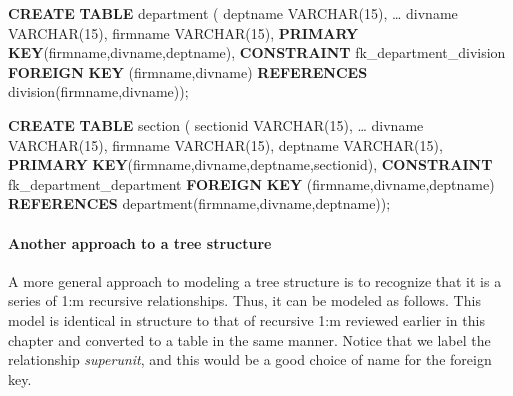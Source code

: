 \documentclass[
]{article}
\newenvironment{Shaded}{\begin{snugshade}}{\end{snugshade}}
\newcommand{\DataTypeTok}[1]{\textcolor[rgb]{0.13,0.29,0.53}{#1}}
\newcommand{\DecValTok}[1]{\textcolor[rgb]{0.00,0.00,0.81}{#1}}
\newcommand{\KeywordTok}[1]{\textcolor[rgb]{0.13,0.29,0.53}{\textbf{#1}}}
\newcommand{\NormalTok}[1]{#1}
\begin{document}
\begin{Shaded}
\begin{Highlighting}[]
\KeywordTok{CREATE} \KeywordTok{TABLE}\NormalTok{ department (}
\NormalTok{    deptname        }\DataTypeTok{VARCHAR}\NormalTok{(}\DecValTok{15}\NormalTok{), }
\NormalTok{    … }
\NormalTok{    divname     }\DataTypeTok{VARCHAR}\NormalTok{(}\DecValTok{15}\NormalTok{),}
\NormalTok{    firmname        }\DataTypeTok{VARCHAR}\NormalTok{(}\DecValTok{15}\NormalTok{),}
        \KeywordTok{PRIMARY} \KeywordTok{KEY}\NormalTok{(firmname,divname,deptname),}
        \KeywordTok{CONSTRAINT}\NormalTok{ fk\_department\_division}
            \KeywordTok{FOREIGN} \KeywordTok{KEY}\NormalTok{ (firmname,divname) }
                \KeywordTok{REFERENCES}\NormalTok{ division(firmname,divname));}
\end{Highlighting}
\end{Shaded}

\begin{Shaded}
\begin{Highlighting}[]
\KeywordTok{CREATE} \KeywordTok{TABLE}\NormalTok{ section (}
\NormalTok{    sectionid       }\DataTypeTok{VARCHAR}\NormalTok{(}\DecValTok{15}\NormalTok{), }
\NormalTok{    … }
\NormalTok{    divname     }\DataTypeTok{VARCHAR}\NormalTok{(}\DecValTok{15}\NormalTok{),}
\NormalTok{    firmname        }\DataTypeTok{VARCHAR}\NormalTok{(}\DecValTok{15}\NormalTok{),}
\NormalTok{    deptname        }\DataTypeTok{VARCHAR}\NormalTok{(}\DecValTok{15}\NormalTok{),}
        \KeywordTok{PRIMARY} \KeywordTok{KEY}\NormalTok{(firmname,divname,deptname,sectionid),}
        \KeywordTok{CONSTRAINT}\NormalTok{ fk\_department\_department}
            \KeywordTok{FOREIGN} \KeywordTok{KEY}\NormalTok{ (firmname,divname,deptname) }
                \KeywordTok{REFERENCES}\NormalTok{ department(firmname,divname,deptname));}
\end{Highlighting}
\end{Shaded}

\hypertarget{another-approach-to-a-tree-structure}{%
\paragraph*{Another approach to a tree structure}\label{another-approach-to-a-tree-structure}}

A more general approach to modeling a tree structure is to recognize
that it is a series of 1:m recursive relationships. Thus, it can be
modeled as follows. This model is identical in structure to that of
recursive 1:m reviewed earlier in this chapter and converted to a table
in the same manner. Notice that we label the relationship \emph{superunit},
and this would be a good choice of name for the foreign key.
\end{document}
